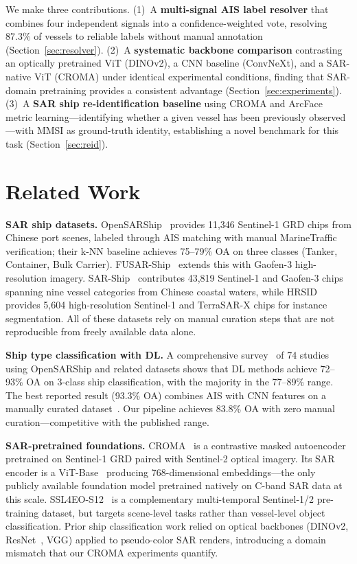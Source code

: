 \documentclass[journal]{IEEEtran}
\begin{document}
We make three contributions.
(1)~A \textbf{multi-signal AIS label resolver} that combines four
independent signals into a confidence-weighted vote, resolving 87.3\%
of vessels to reliable labels without manual annotation
(Section~\ref{sec:resolver}).
(2)~A \textbf{systematic backbone comparison} contrasting an
optically pretrained ViT (DINOv2), a CNN baseline (ConvNeXt), and a
SAR-native ViT (CROMA) under identical experimental conditions, finding
that SAR-domain pretraining provides a consistent advantage
(Section~\ref{sec:experiments}).
(3)~A \textbf{SAR ship re-identification baseline} using CROMA and
ArcFace metric learning---identifying whether a given vessel has been
previously observed---with MMSI as ground-truth identity, establishing
a novel benchmark for this task (Section~\ref{sec:reid}).

\section{Related Work}

\textbf{SAR ship datasets.}
OpenSARShip~\cite{huang2018} provides 11,346 Sentinel-1 GRD chips from
Chinese port scenes, labeled through AIS matching with manual MarineTraffic
verification; their k-NN baseline achieves 75--79\% OA on three classes
(Tanker, Container, Bulk Carrier).
FUSAR-Ship~\cite{hou2020} extends this with Gaofen-3 high-resolution
imagery.
SAR-Ship~\cite{wang2019sarship} contributes 43,819 Sentinel-1 and Gaofen-3
chips spanning nine vessel categories from Chinese coastal waters,
while HRSID~\cite{wei2020hrsid} provides 5,604 high-resolution
Sentinel-1 and TerraSAR-X chips for instance segmentation.
All of these datasets rely on manual curation steps that are not
reproducible from freely available data alone.

\textbf{Ship type classification with DL.}
A comprehensive survey~\cite{slesinski2025} of 74 studies using OpenSARShip
and related datasets shows that DL methods achieve 72--93\% OA on 3-class
ship classification, with the majority in the 77--89\% range.
The best reported result (93.3\% OA) combines AIS with CNN features on
a manually curated dataset~\cite{zeng2021}.
Our pipeline achieves 83.8\% OA with zero manual curation---competitive
with the published range.

\textbf{SAR-pretrained foundations.}
CROMA~\cite{fuller2023} is a contrastive masked autoencoder~\cite{he2022mae}
pretrained on Sentinel-1 GRD paired with Sentinel-2 optical imagery.
Its SAR encoder is a ViT-Base~\cite{dosovitskiy2021} producing 768-dimensional
embeddings---the only publicly available foundation model pretrained natively on
C-band SAR data at this scale.
SSL4EO-S12~\cite{wang2023ssl4eo} is a complementary multi-temporal Sentinel-1/2
pre-training dataset, but targets scene-level tasks rather than vessel-level
object classification.
Prior ship classification work relied on optical backbones (DINOv2, ResNet~\cite{he2016},
VGG) applied to pseudo-color SAR renders, introducing a domain mismatch
that our CROMA experiments quantify.
\end{document}

